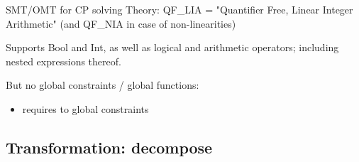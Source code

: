 \documentclass{cons-beamer}
\begin{document}
\begin{frame}{SMT/OMT for CP solving}
  Theory: QF\_LIA = "Quantifier Free, Linear Integer Arithmetic"
  (and QF\_NIA in case of non-linearities)
  \vfill

  Supports Bool and Int, as well as logical and arithmetic operators; including nested expressions thereof.
  \vfill

  But no global constraints / global functions:
  \begin{itemize}
    \item requires to  global constraints
  \end{itemize}
\end{frame}


\subsection*{Transformation: decompose}
\end{document}
